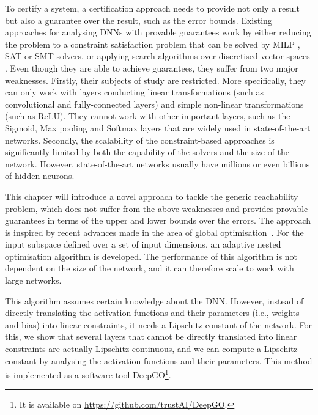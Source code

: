 To certify a system, a certification approach needs to provide not only a result but also a guarantee over the result, such as the error bounds. 
Existing approaches for analysing DNNs with provable guarantees work by either reducing the problem to a constraint satisfaction problem that can be solved by MILP \cite{LM2017,CNR2017,bunel2017piecewise,xiang2017output}, SAT \cite{NKPSW2017} or SMT \cite{katz2017reluplex,bunel2017piecewise} solvers, or applying search algorithms over discretised vector spaces \cite{HKWW2017,wicker2018feature}. Even though they are able to achieve guarantees, they suffer from two major weaknesses. Firstly, their subjects of study are restricted. 
More specifically, they can only work with layers conducting linear transformations (such as convolutional and fully-connected layers) and simple non-linear transformations (such as ReLU). They cannot work with other important layers, such as the Sigmoid, Max pooling and Softmax layers that are widely used in state-of-the-art networks. Secondly, the scalability of the constraint-based approaches is significantly limited by both the capability of the solvers and the size of the network. However, state-of-the-art networks usually have millions or even billions of hidden neurons. 

This chapter will introduce a novel approach to tackle the generic reachability problem, which does not suffer from the above weaknesses and provides provable guarantees %
in terms of the upper and lower bounds over the errors. The approach is inspired by recent advances made in the area of global optimisation~\cite{gergel2016adaptive,grishagin2018convergence}. 
For the input subspace defined over a set of input dimensions, an adaptive nested optimisation algorithm is developed. The performance of this algorithm is not dependent on the size of the network, and it can therefore scale to work with large networks. 

This algorithm assumes certain knowledge about the DNN. However, instead of directly translating the activation functions and their parameters (i.e., weights and bias) into linear constraints, %
it needs a Lipschitz constant of the network. For this, we show that several layers that cannot be directly translated into linear constraints are actually Lipschitz continuous, and we can compute a Lipschitz constant by analysing the activation functions and their parameters. This method is implemented as a software tool DeepGO\footnote{It is available on \url{https://github.com/trustAI/DeepGO}.}. 

